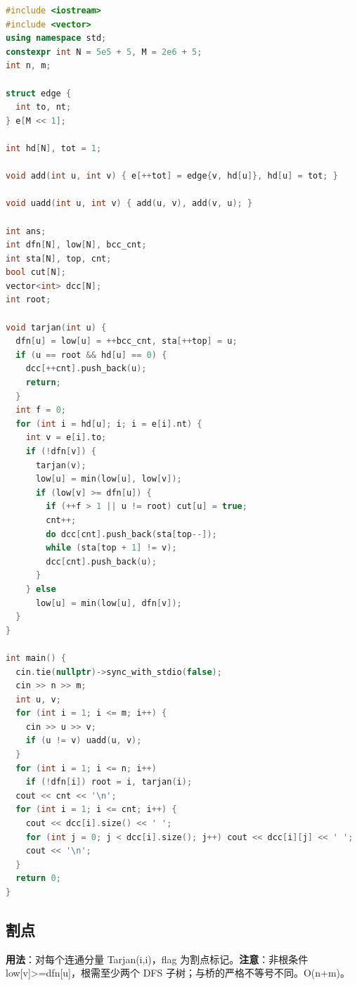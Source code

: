 \documentclass[a4paper,9pt]{extarticle}
\begin{document}
\begin{lstlisting}[language={C++}]
#include <iostream>
#include <vector>
using namespace std;
constexpr int N = 5e5 + 5, M = 2e6 + 5;
int n, m;

struct edge {
  int to, nt;
} e[M << 1];

int hd[N], tot = 1;

void add(int u, int v) { e[++tot] = edge{v, hd[u]}, hd[u] = tot; }

void uadd(int u, int v) { add(u, v), add(v, u); }

int ans;
int dfn[N], low[N], bcc_cnt;
int sta[N], top, cnt;
bool cut[N];
vector<int> dcc[N];
int root;

void tarjan(int u) {
  dfn[u] = low[u] = ++bcc_cnt, sta[++top] = u;
  if (u == root && hd[u] == 0) {
    dcc[++cnt].push_back(u);
    return;
  }
  int f = 0;
  for (int i = hd[u]; i; i = e[i].nt) {
    int v = e[i].to;
    if (!dfn[v]) {
      tarjan(v);
      low[u] = min(low[u], low[v]);
      if (low[v] >= dfn[u]) {
        if (++f > 1 || u != root) cut[u] = true;
        cnt++;
        do dcc[cnt].push_back(sta[top--]);
        while (sta[top + 1] != v);
        dcc[cnt].push_back(u);
      }
    } else
      low[u] = min(low[u], dfn[v]);
  }
}

int main() {
  cin.tie(nullptr)->sync_with_stdio(false);
  cin >> n >> m;
  int u, v;
  for (int i = 1; i <= m; i++) {
    cin >> u >> v;
    if (u != v) uadd(u, v);
  }
  for (int i = 1; i <= n; i++)
    if (!dfn[i]) root = i, tarjan(i);
  cout << cnt << '\n';
  for (int i = 1; i <= cnt; i++) {
    cout << dcc[i].size() << ' ';
    for (int j = 0; j < dcc[i].size(); j++) cout << dcc[i][j] << ' ';
    cout << '\n';
  }
  return 0;
}
\end{lstlisting}

\subsection{割点}

\textbf{用法}：对每个连通分量 Tarjan(\allowbreak{}i,\allowbreak{}i)，flag 为割点标记。\textbf{注意}：非根条件 low[v]>\allowbreak{}=\allowbreak{}dfn[u]，根需至少两个 DFS 子树；与桥的严格不等号不同。O(\allowbreak{}n+\allowbreak{}m)。
\end{document}
